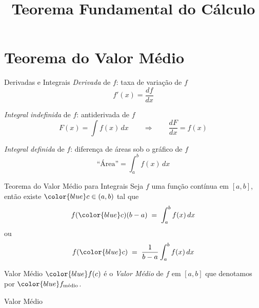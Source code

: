 
\usepackage{integracao_e_series}

\title{Teorema Fundamental do Cálculo}



\addtitle

\section{Teorema do Valor Médio}

\begin{frame}{Derivadas e Integrais}
\emph{Derivada} de $f$: \quad taxa de variação de $f$
\[
  f'(x) = \frac{df}{dx}
\]

\pause
\emph{Integral indefinida} de $f$: \quad antiderivada de $f$
\[
  F(x) = \int f(x)\,dx \qquad\Rightarrow\qquad \frac{dF}{dx} = f(x)
\]

\pause
\emph{Integral definida} de $f$: \quad diferença de áreas sob o gráfico de $f$
\[
  \text{``Área''} = \int_a^b f(x)\,dx
\]
\end{frame}

\begin{frame}{Teorema do Valor Médio para Integrais}
  Seja $f$ uma função {\color{blue} contínua} em $[a, b]$, \pause
  então existe ${\color{blue} c} \in (a, b)$ \pause
  tal que
  \[
    f({\color{blue}c})(b-a)
    \;=\; \int_a^b f(x)\,dx
  \]
  \pause
  ou
  \[
    f({\color{blue}c})
    \;=\; \frac{1}{b-a}\int_a^b f(x)\,dx
  \]
\end{frame}

\begin{frame}{Valor Médio}
  ${\color{blue}f(c)}$ é o \emph{Valor Médio} de $f$ em $[a, b]$
  que denotamos por ${\color{blue}f_{\text{médio}}}$.
\end{frame}

\begin{frame}{Valor Médio}
  \centering
  \vspace{\baselineskip}
  
\end{frame}

